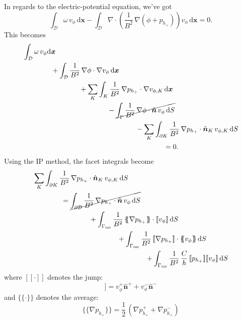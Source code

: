 \documentclass[12pt]{article}
\begin{document}
In regards to the electric-potential equation, we've got
%
\begin{equation}
    \int_\mathcal{D} \omega \, v_\phi \, \mathrm{d}\bm{x} - \int_\mathcal{D} \nabla \cdot \left( \frac{1}{B^2} \, \nabla (\phi + p_{h_+}) \right) v_\phi \, \mathrm{d}\bm{x} = 0.
\end{equation}
%
This becomes
%
\begin{equation}
    \begin{aligned}
        & \int_\mathcal{D} \omega \, v_\phi \mathrm{d}\bm{x} \\
        & \hspace{4em} + \int_\mathcal{D} \frac{1}{B^2} \, \nabla \phi \cdot \nabla v_\phi \, \mathrm{d}\bm{x} \\
        & \hspace{8em} + \sum_K \int_K \frac{1}{B^2} \, \nabla p_{h_+} \cdot \nabla v_{\phi,K} \, \mathrm{d}\bm{x} \\
        & \hspace{12em} - \cancel{ \int_\Gamma \frac{1}{B^2} \, \nabla \phi \cdot \hat{\bm{n}} \, v_\phi \, \mathrm{d}S } \\
        & \hspace{16em} - \sum_K \int_{\partial K} \frac{1}{B^2} \, \nabla p_{h_+} \cdot \hat{\bm{n}}_K \, v_{\phi,K} \, \mathrm{d}S \\
        & \hspace{20em} = 0.
    \end{aligned}
\end{equation}
%
Using the IP method, the facet integrals become
%
\begin{equation}
    \begin{aligned}
        & \sum_K \int_{\partial K} \frac{1}{B^2} \, \nabla p_{h_+} \cdot \hat{\bm{n}}_K \, v_{\phi,K} \, \mathrm{d}S \\
        & \hspace{4em} = \cancel{ \int_{\partial\mathcal{D}} \frac{1}{B^2} \, \nabla p_{h_+} \cdot \hat{\bm{n}} \, v_\phi \, \mathrm{d}S } \\
        & \hspace{8em} + \int_{\Gamma_\text{int}} \frac{1}{B^2} \, \{\!\!\{ \nabla p_{h_+} \}\!\!\} \cdot [\![ v_\phi  ]\!] \, \mathrm{d}S \\
        & \hspace{12em} + \int_{\Gamma_\text{int}} \frac{1}{B^2} \, [\![ \nabla p_{h_+}  ]\!] \cdot \{\!\!\{ v_\phi \}\!\!\} \, \mathrm{d}S \\
        & \hspace{16em} + \int_{\Gamma_\text{int}} \frac{1}{B^2} \, \frac{C}{h} \, [\![ p_{h_+}  ]\!] [\![ v_\phi  ]\!] \, \mathrm{d}S
    \end{aligned}
\end{equation}
%
where $[\![ \cdot ]\!]$ denotes the jump:
%
\begin{equation}
    [\![ v_\phi ]\!] = v_\phi^+ \hat{\bm{n}}^+ + v_\phi^- \hat{\bm{n}}^-
\end{equation}
%
and $\{\!\!\{ \cdot \}\!\!\}$ denotes the average:
%
\begin{equation}
    \{\!\!\{ \nabla p_{h_+} \}\!\!\} = \frac{1}{2} \, (\nabla p_{h_+}^+ + \nabla p_{h_+}^-)
\end{equation}
\end{document}
